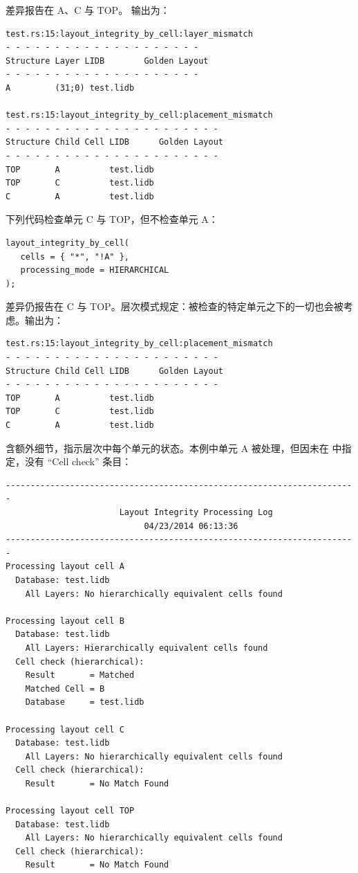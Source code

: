 差异报告在 A、C 与 TOP。 输出为：

\begin{lstlisting}
test.rs:15:layout_integrity_by_cell:layer_mismatch
- - - - - - - - - - - - - - - - - - - -
Structure Layer LIDB        Golden Layout
- - - - - - - - - - - - - - - - - - - -
A         (31;0) test.lidb

test.rs:15:layout_integrity_by_cell:placement_mismatch
- - - - - - - - - - - - - - - - - - - - - -
Structure Child Cell LIDB      Golden Layout
- - - - - - - - - - - - - - - - - - - - - -
TOP       A          test.lidb
TOP       C          test.lidb
C         A          test.lidb
\end{lstlisting}

下列代码检查单元 C 与 TOP，但不检查单元 A：

\begin{lstlisting}[style=pxl]
layout_integrity_by_cell(
   cells = { "*", "!A" },
   processing_mode = HIERARCHICAL
);
\end{lstlisting}

差异仍报告在 C 与 TOP。层次模式规定：被检查的特定单元之下的一切也会被考虑。输出为：

\begin{lstlisting}
test.rs:15:layout_integrity_by_cell:placement_mismatch
- - - - - - - - - - - - - - - - - - - - - -
Structure Child Cell LIDB      Golden Layout
- - - - - - - - - - - - - - - - - - - - - -
TOP       A          test.lidb
TOP       C          test.lidb
C         A          test.lidb
\end{lstlisting}

 含额外细节，指示层次中每个单元的状态。本例中单元 A 被处理，但因未在  中指定，没有 “Cell check” 条目：

\begin{lstlisting}
-----------------------------------------------------------------------
                       Layout Integrity Processing Log
                            04/23/2014 06:13:36
-----------------------------------------------------------------------
Processing layout cell A
  Database: test.lidb
    All Layers: No hierarchically equivalent cells found

Processing layout cell B
  Database: test.lidb
    All Layers: Hierarchically equivalent cells found
  Cell check (hierarchical):
    Result       = Matched
    Matched Cell = B
    Database     = test.lidb

Processing layout cell C
  Database: test.lidb
    All Layers: No hierarchically equivalent cells found
  Cell check (hierarchical):
    Result       = No Match Found

Processing layout cell TOP
  Database: test.lidb
    All Layers: No hierarchically equivalent cells found
  Cell check (hierarchical):
    Result       = No Match Found
\end{lstlisting}

